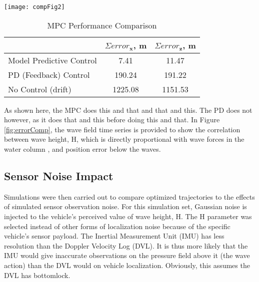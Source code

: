 \documentclass[letterpaper, 10pt, conference]{IEEEtran}
\renewcommand{\vec}[1]{\mathbf{#1}}
\begin{document}
\begin{figure*}
\texttt{[image: compFig2]}
\centering
\caption{Position errors in global $\vec{x}$ and $\vec{z}$ coordinates when comparing a traditional feedback controller with a model predictive controller. As shown, MPC returns error values one order of magnitude lower than PD Control. Summed error values for these results are shown in Table \ref{table:errorSum}.} 
\label{fig:errorComp}
\end{figure*}

\begin{table}[h]
\caption{MPC Performance Comparison}
\begin{center}
\def\arraystretch{1.1}%
\begin{tabular}{ |l|c|c| } 
 \hline 
  & $\Sigma error_\vec{x}$, m & $\Sigma error_\vec{z}$, m \\ 
 \hline
 Model Predictive Control & 7.41 & 11.47 \\ 
 PD (Feedback) Control & 190.24 & 191.22 \\ 
 No Control (drift) & 1225.08 & 1151.53 \\
 \hline
\end{tabular}
\end{center}
\label{table:errorSum}
\end{table}

As shown here, the MPC does this and that and that and this. The PD does not however, as it does that and this before doing this and that. In Figure \ref{fig:errorComp}, the wave field time series is provided to show the correlation between wave height, H, which is directly proportional with wave forces in the water column \cite{D&D}, and position error below the waves. 

\subsection{Sensor Noise Impact} \label{results:noise}

Simulations were then carried out to compare optimized trajectories to the effects of simulated sensor observation noise. For this simulation set, Gaussian noise is injected to the vehicle's perceived value of wave height, H. The H parameter was selected instead of other forms of localization noise because of the specific vehicle's sensor payload. The Inertial Measurement Unit (IMU) has less resolution than the Doppler Velocity Log (DVL). It is thus more likely that the IMU would give inaccurate observations on the pressure field above it (the wave action) than the DVL would on vehicle localization. Obviously, this assumes the DVL has bottomlock. 
\end{document}
